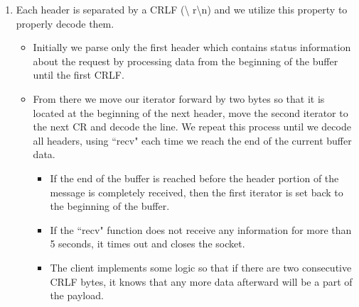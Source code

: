 \documentclass{article}
\begin{document}
        \begin{enumerate}
            \item Each header is separated by a CRLF (\textbackslash
                r\textbackslash n) and we utilize this property to properly
                decode them.
            \begin{itemize}
                \item Initially we parse only the first header which contains
                    status information about the request by processing data
                    from the beginning of the buffer until the first CRLF.
                \item From there we move our iterator forward by two bytes so
                    that it is located at the beginning of the next header,
                    move the second iterator to the next CR and decode the
                    line. We repeat this process until we decode all headers,
                    using ``recv" each time we reach the end of the current
                    buffer data.
                \begin{itemize}
                    \item If the end of the buffer is reached before the header
                        portion of the message is completely received, then the
                        first iterator is set back to the beginning of the
                        buffer.

                    \item If the ``recv" function does not receive any information
                        for more than 5 seconds, it times out and closes the
                        socket.
                    
                    \item The client implements some logic so that if there are
                        two consecutive CRLF bytes, it knows that any more data
                        afterward will be a part of the payload.
                \end{itemize}
            \end{itemize}


\end{enumerate}
\end{document}
